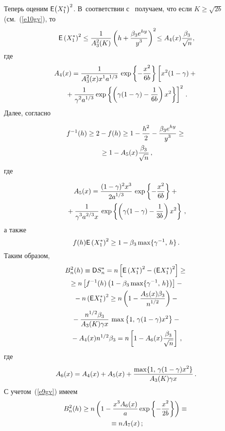 \begin{multicols}{2}
Теперь оценим ${\sf E}\big(X_1^*\big)^2$. В~соответствии с~\cite{Tysiak} получаем, что если $K\ge\sqrt{2b}$ 
(см.~(\ref{e10gv}), то
\begin{equation}
{\sf E}\left(X_1^*\right)^2\le \fr{1}{A_3^{2}(K)}\left(h+\fr{\betr
e^{hy}}{y^{3}}\right)^2\!\le A_4(x)\Lo,\!\label{e12gv}
\end{equation}
где
\begin{multline*}
A_4(x)=\fr{1}{A_3^2(x)x^{\d}a^{1/3}}\,\exp\left\{-\fr{x^2}{6b}\right\}
\left[
\vphantom{\fr{1}{6}}
x^2(1-\gamma)+{}\right.\\
\left.{}+\fr{1}{\gamma^{2}a^{\d/3}}\exp\left\{\left(\gamma(1-\gamma)-
\fr{\d}{6b}\right)x^2\right\}
\right]^2\,.
\end{multline*}
Далее, согласно~\cite{Tysiak}

\noindent
\begin{multline*}
f^{-1}(h)\ge 2-f(h)\ge 1-\fr{h^2}{2}-\fr{\betr
e^{hy}}{y^{3}}\ge{}\\
{}\ge 1-A_5(x)\Lo\,,
\end{multline*}
где

\noindent
\begin{multline*}
A_5(x)=\fr{(1-\gamma)^2x^{3}}{2a^{1/3}}\,\exp\left\{-\fr{x^2}{6b}\right\}+{}\\
{}+
\fr{1}{\gamma^{3}a^{2/3}x}\,\exp\left\{\left(\gamma(1-\gamma)-
\fr{1}{3b}\right)x^2\right\}\,,
\end{multline*}
а также
$$
f(h){\sf E}\left(X_1^*\right)^2\ge 1-\betr\max\{\gamma^{-\d},\,h\}\,.
$$
Таким образом,
\begin{multline*}
B_n^2(h)\equiv {\sf D}S_n^*= n\left[{\sf
E}\left(X_1^*\right)^2-\left({\sf E}X_1^*\right)^2\right]\ge{}\\
{}\ge
n\left[f^{-1}(h)\left(1-\betr\max\{\gamma^{-\d},\,h\}\right)\right]-{}\\
{}- n\left({\sf
E}X_1^*\right)^2 \ge
n\left(1-\fr{A_5(x)\betr}{n^{\d/2}}\right)-{}\\
{}-\fr{n^{\d/2}\betr}{A_3(K)\gamma
x}\,\max\left\{1,\,\gamma(1-\gamma)x^2\right\}-{}\\
{}-A_4(x)n^{\d/2}\betr=n\left[1-A_6(x)\Lo\right]\,,
\end{multline*}
где
$$
A_6(x)=A_4(x)+A_5(x)+\fr{\max\{1,\,\gamma(1-\gamma)x^2\}}{A_3(K)\gamma
x}\,.
$$
С учетом~(\ref{e9gv}) имеем
\begin{multline}
B_n^2(h)\ge
n\left(1-\fr{x^{3}A_6(x)}{a}\exp\left\{-\fr{x^2}{2b}\right\}\right)\equiv{}\\
{}\equiv 
nA_7(x)\,;
\label{e13gv}
\end{multline}


\end{multicols}
